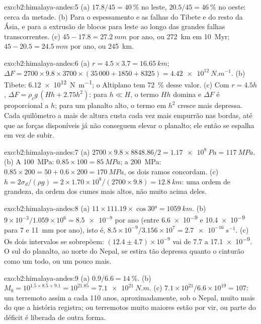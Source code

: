 \begin{solution}{exo:b2:himalaya-andes:5}
(a) $17.8/45 = \qty{40}{\percent}$ no leste, $20.5/45 = \qty{46}{\percent}$ no oeste:
cerca da metade. (b) Para o espessamento e as falhas do Tibete e do resto da Ásia, e para
a extrusão de blocos para leste ao longo das grandes falhas transcorrentes. (c) $45 - 17.8 =
\qty{27.2}{mm}$ por ano, ou \qty{272}{km} em \qty{10}{Myr}; $45 - 20.5 = \qty{24.5}{mm}$ por
ano, ou \qty{245}{km}.
\end{solution}

\begin{solution}{exo:b2:himalaya-andes:6}
(a) $r = 4.5\times3.7 = \qty{16.65}{km}$; $\Delta F = 2700\times9.8\times3700\times(35\,000 +
1850 + 8325) = \qty{4.42e12}{N.m^{-1}}$. (b) Tibete: \qty{6.12e12}{N.m^{-1}}; o Altiplano
tem \qty{72}{\percent} desse valor. (c) Com $r = 4.5h$, $\Delta F = \rho_c g\,(Hh + 2.75h^2)$: para
$h \ll H$, o termo $Hh$ domina e $\Delta F$ é proporcional a $h$; para um planalto alto,
o termo em $h^2$ cresce mais depressa. Cada quilômetro a mais de altura custa cada vez mais empurrão nas
bordas, até que as forças disponíveis já não conseguem elevar o planalto; ele então se espalha
em vez de subir.
\end{solution}

\begin{solution}{exo:b2:himalaya-andes:7}
(a) $2700\times9.8\times8848.86/2 = \qty{1.17e8}{Pa} = \qty{117}{MPa}$. (b) A
\qty{100}{MPa}: $0.85\times100 = \qty{85}{MPa}$; a \qty{200}{MPa}: $0.85\times200 = 50 +
0.6\times200 = \qty{170}{MPa}$, os dois ramos concordam. (c) $h = 2\sigma_d/(\rho g) =
2\times1.70\times10^8/(2700\times9.8) = \qty{12.8}{km}$: uma ordem de grandeza, da ordem
dos cumes mais altos, não muito acima deles.
\end{solution}

\begin{solution}{exo:b2:himalaya-andes:8}
(a) $11\times111.19\times\cos\ang{30} = \qty{1059}{km}$. (b) $9\times10^{-3}/1.059\times10^{6}
= \num{8.5e-9}$ por ano (entre \num{6.6e-9} e \num{10.4e-9} para 7 e \qty{11}{mm} por ano),
isto é, $8.5\times10^{-9}/3.156\times10^{7} = \qty{2.7e-16}{s^{-1}}$. (c) Os dois intervalos
se sobrepõem: $(12.4 \pm 4.7) \times 10^{-9}$ vai de 7.7 a \num{17.1e-9}. O sul do planalto, ao norte do
Nepal, se estira tão depressa quanto o cinturão como um todo, ou um pouco mais.
\end{solution}

\begin{solution}{exo:b2:himalaya-andes:9}
(a) $0.9/6.6 = \qty{14}{\percent}$. (b) $M_0 = 10^{1.5\times8.5 + 9.1} = 10^{21.85} =
\qty{7.1e21}{N.m}$. (c) $7.1\times10^{21}/6.6\times10^{19} = 107$: um terremoto assim a cada
110 anos, aproximadamente, sob o Nepal, muito mais do que a história registra; ou terremotos muito maiores
estão por vir, ou parte do déficit é liberada de outra forma.
\end{solution}


